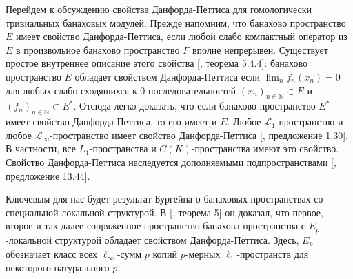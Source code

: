 \documentclass[12pt]{article}
\begin{document}
Перейдем к обсуждению свойства Данфорда-Петтиса для гомологически тривиальных банаховых модулей. Прежде напомним, что банахово пространство $E$ имеет свойство Данфорда-Петтиса, если любой слабо компактный оператор из $E$ в произвольное банахово пространство $F$ вполне непрерывен. Существует простое внутреннее описание этого свойства [\cite{KalAlbTopicsBanSpTh}, теорема 5.4.4]: банахово пространство $E$ обладает свойством Данфорда-Петтиса если $\lim_n f_n(x_n)=0$ для любых слабо сходящихся к $0$ последовательностей $(x_n)_{n\in\mathbb{N}}\subset E$ и $(f_n)_{n\in\mathbb{N}}\subset E^*$. Отсюда легко доказать, что если банахово пространство $E^*$ имеет свойство Данфорда-Петтиса, то его имеет и $E$. Любое $\mathscr{L}_1$-пространство и любое $\mathscr{L}_\infty$-пространство имеет свойство Данфорда-Петтиса  [\cite{BourgNewClOfLpSp}, предложение 1.30]. В частности, все $L_1$-пространства и $C(K)$-пространства имеют это свойство. Свойство Данфорда-Петтиса наследуется дополняемыми подпространствами [\cite{FabHabBanSpTh}, предложение 13.44]. 

Ключевым для нас будет результат Бургейна о банаховых пространствах со специальной локальной структурой. В [\cite{BourgOnTheDPP}, теорема 5] он доказал, что первое, второе и так далее сопряженное пространство банахова пространства с $E_p$-локальной структурой обладает свойством Данфорда-Петтиса. Здесь, $E_p$ обозначает класс всех $\ell_\infty$-сумм $p$ копий $p$-мерных $\ell_1$-пространств для некоторого натурального $p$. 
\end{document}
